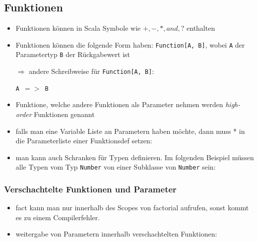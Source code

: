 \subsection{Funktionen}
\begin{itemize}
  \item Funktionen können in Scala Symbole wie $+, -, *, and, ?$ enthalten
  \item Funktionen können die folgende Form
  haben: \texttt{Function[A, B]}, wobei \texttt{A} der Parametertyp 
  \und \texttt{B} der Rückgabewert ist
  
  $\Rightarrow$ andere Schreibweise für \texttt{Function[A, B]}:
  
  \begin{center}
    \texttt{A $=>$ B}
  \end{center}
    
  \item Funktione, welche andere Funktionen als Parameter nehmen werden
  \textit{high-order} Funktionen genannt
    \item falls man eine Variable Liste an Parametern haben möchte, dann muss *
  in die Parameterliste einer Funktionsdef setzen:
  

    
  \item man kann auch Schranken für Typen definieren. Im folgenden Beispiel müssen alle Typen vom Typ \texttt{Number} \oder von einer Subklasse von
  \texttt{Number} sein:
  
  

\end{itemize}


\subsubsection{Verschachtelte Funktionen und Parameter}
\begin{itemize}
  \item   
  
  fact kann man nur innerhalb des Scopes von factorial aufrufen, sonst kommt
  es zu einem Compilerfehler.
  
  \item weitergabe von Parametern innerhalb verschachtelten Funktionen:
  
    

\end{itemize}


